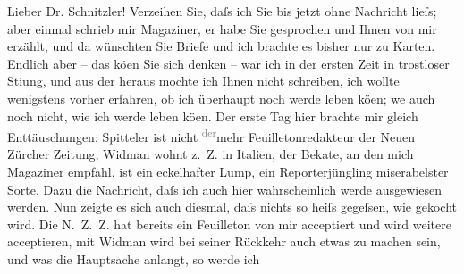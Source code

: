 \pstart{}Lieber Dr. Schnitzler!\pend\vspace{0.5em}
\pstart
           Verzeihen Sie, daſs ich Sie bis jetzt ohne Nachricht lieſs; aber einmal schrieb mir
                  Magaziner, er habe Sie gesprochen und Ihnen
               von mir erzählt, und da{\geminationn} wünschten Sie Briefe und \introOben{}ich\introOben{} brachte es bisher nur zu Karten. Endlich aber – das kö{\geminationn}en Sie sich denken – war ich in der ersten Zeit in
               trostloser Sti{\geminationm}ung, und aus der heraus mochte ich Ihnen
               nicht schreiben, ich wollte wenigstens vorher erfahren, ob ich überhaupt noch werde
               leben kö{\geminationn}en; we{\geminationn} auch noch
               nicht, wie ich werde leben kö{\geminationn}en. Der erste Tag hier
               brachte mir gleich Enttäuschungen: Spitteler
               ist nicht \substVorne{}\textsuperscript{\textcolor{gray}{der}}\substDazwischen{}mehr\substHinten{} Feuilletonredakteur der Neuen Zürcher
                  Zeitung, Widman wohnt z. Z. in Italien,
               der Beka{\geminationn}te, an den mich Magaziner empfahl, ist ein eckelhafter Lump, ein
               Reporterjüngling miserabelster Sorte. Dazu die Nachricht, daſs ich auch hier
               wahrscheinlich werde ausgewiesen werden. Nun zeigte es sich auch diesmal, daſs nichts
               so heiſs gegeſsen, wie gekocht wird. Die N. Z. Z. hat bereits ein Feuilleton von mir acceptiert und wird weitere
               acceptieren, mit Widman wird bei seiner
               Rückkehr auch etwas zu machen sein, und was die Hauptsache anlangt, so werde ich
